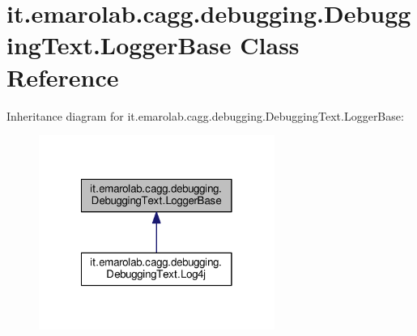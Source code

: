 \hypertarget{classit_1_1emarolab_1_1cagg_1_1debugging_1_1DebuggingText_1_1LoggerBase}{\section{it.\-emarolab.\-cagg.\-debugging.\-Debugging\-Text.\-Logger\-Base Class Reference}
\label{classit_1_1emarolab_1_1cagg_1_1debugging_1_1DebuggingText_1_1LoggerBase}
}


Inheritance diagram for it.\-emarolab.\-cagg.\-debugging.\-Debugging\-Text.\-Logger\-Base\-:\nopagebreak
\begin{figure}[H]
\begin{center}
\leavevmode
\includegraphics[width=218pt]{classit_1_1emarolab_1_1cagg_1_1debugging_1_1DebuggingText_1_1LoggerBase__inherit__graph}
\end{center}
\end{figure}
